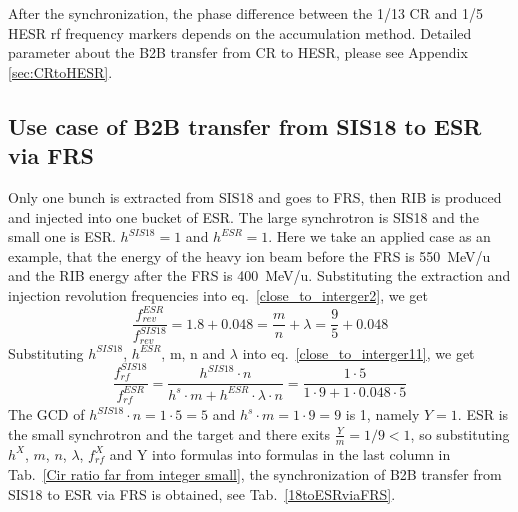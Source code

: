 After the synchronization, the phase difference between the 1/13 CR and 1/5 HESR rf frequency markers depends on the accumulation method. Detailed parameter about the B2B transfer from CR to HESR, please see Appendix \ref{sec:CRtoHESR}. 
\subsection{Use case of B2B transfer from SIS18 to ESR via FRS} 
Only one bunch is extracted from SIS18 and goes to FRS, then RIB is produced and injected into one bucket of ESR. The large synchrotron is SIS18 and the small one is ESR. $h^{\mathit{SIS18}}=1$ and $h^{\mathit{ESR}}=1$. Here we take an applied case as an example, that the energy of the heavy ion beam before the FRS is \SI{550}{MeV/\atomicmassunit} and the RIB energy after the FRS is \SI{400}{MeV/\atomicmassunit}. Substituting the extraction and injection revolution frequencies into eq.~\ref{close_to_interger2}, we get
\begin{equation} 
\frac{f_{\mathit{rev}}^{\mathit{ESR}}}{f_{\mathit{rev}}^{\mathit{SIS18}}}=1.8+0.048=\frac{m}{n}+ \lambda=\frac{9}{5}+0.048
\end{equation}
Substituting $h^{\mathit{SIS18}}$, $h^{\mathit{ESR}}$, m, n and $\lambda$ into eq.~\ref{close_to_interger11}, we get
\begin{equation}
\frac{f_{\mathit{rf}}^{\mathit{SIS18}}}{f_{\mathit{rf}}^{\mathit{ESR}}}=\frac{h^{\mathit{SIS18}}\cdot n}{h^s \cdot m+ h^{\mathit{ESR}} \cdot\lambda\cdot n}=\frac{1\cdot 5}{1 \cdot 9+1 \cdot0.048\cdot 5}
\end{equation}
The GCD of $h^{\mathit{SIS18}}\cdot n=1\cdot5=5$ and $h^s \cdot m=1\cdot 9=9$ is 1, namely $Y=1$. ESR is the small synchrotron and the target and there exits $\frac{Y}{m}=1/9<1$, so substituting $h^X$, $m$, $n$, $\lambda$, $f_{\mathit{rf}}^{X}$ and Y into formulas into formulas in the last column in Tab.~\ref{Cir ratio far from integer small}, the synchronization of B2B transfer from SIS18 to ESR via FRS is obtained, see Tab.~\ref{18toESRviaFRS}.
